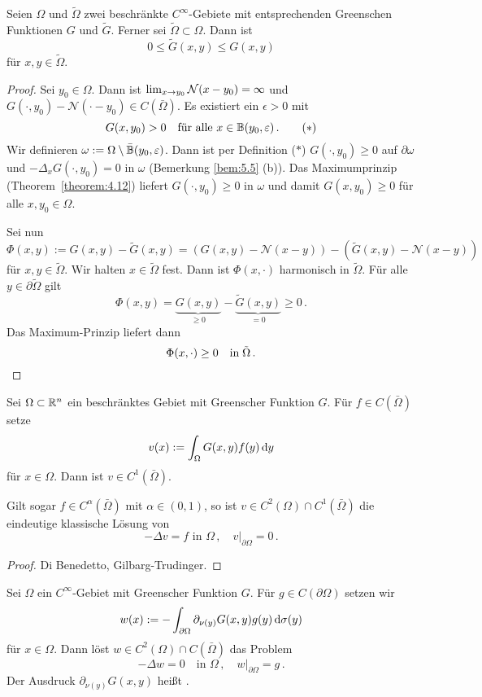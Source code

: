 \begin{lemma}
  \label{lemma:5.6}
  Seien $\Omega$ und $\tilde\Omega$ zwei beschränkte $C^\infty$-Gebiete mit entsprechenden Greenschen Funktionen $G$ und $\tilde G$. Ferner sei $\tilde\Omega\subset\Omega$. Dann ist
  \[ 0\leq \tilde G(x,y)\leq G(x,y) \]
  für $x,y\in\tilde\Omega$.
\end{lemma}

\begin{proof}
  Sei $y_0\in\Omega$. Dann ist $\lim_{x\rightarrow y_0}\mathcal{N}(x-y_0)=\infty$ und $G(\cdot,y_0)-\mathcal{N}(\cdot-y_0)\in C(\bar\Omega)$. Es existiert ein $\epsilon>0$ mit 
  \[ G(x,y_0)>0\quad\text{für alle }x\in\mathbb{B}(y_0,\varepsilon)\, . \tag{$\ast$} \]
  Wir definieren $\omega:=\Omega\setminus\bar{\mathbb{B}}(y_0,\varepsilon)$. Dann ist per Definition ($\ast$) $G(\cdot,y_0)\geq0$ auf $\partial\omega$ und $-\Delta_xG(\cdot,y_0)=0$ in $\omega$ (Bemerkung \ref{bem:5.5} (b)). Das Maximumprinzip (Theorem~\ref{theorem:4.12}) liefert $G(\cdot,y_0)\geq0$ in $\omega$ und damit $G(x,y_0)\geq0$ für alle $x,y_0\in\Omega$.
  
  Sei nun 
  \[ \Phi(x,y):=G(x,y)-\tilde G(x,y)=(G(x,y)-\mathcal{N}(x-y))-(\tilde G(x,y)-\mathcal{N}(x-y)) \]
  für $x,y\in\tilde\Omega$. Wir halten $x\in\tilde\Omega$ fest. Dann ist $\Phi(x, \cdot)$ harmonisch in $\tilde\Omega$. Für alle $y\in\partial\tilde\Omega$ gilt 
  \[
\Phi(x,y)=\underbrace{G(x,y)}_{\geq0}-\underbrace{\tilde G(x,y)}_{=0}\geq0 \, .
\]
Das Maximum-Prinzip liefert dann
\[
\Phi(x,\cdot)\geq0\quad\text{in}\;\tilde\Omega \, .\qedhere
\]
\end{proof}

\begin{theorem}
  \label{theorem:5.7}
  Sei $\Omega\subset\mathbb{R}^n$ ein beschränktes Gebiet mit Greenscher Funktion $G$. Für $f\in C(\bar\Omega)$ setze 
  \[ v(x):=\int_\Omega G(x,y)f(y)\,\mathrm{d} y \]
  für $x\in\Omega$. Dann ist $v\in C^1(\bar\Omega)$. 

  Gilt sogar $f\in C^\alpha(\bar\Omega)$ mit $\alpha\in (0,1)$, so ist $v\in C^2(\Omega)\cap C^1(\bar\Omega)$ die eindeutige klassische Lösung von
  \[
  -\Delta v=f\text{ in }\Omega\, ,\quad v\rvert_{\partial\Omega}=0\, .
  \]
\end{theorem}

\begin{proof}
  Di Benedetto, Gilbarg-Trudinger.
\end{proof}

\begin{theorem}
  \label{theorem:5.8}
  Sei $\Omega$ ein $C^\infty$-Gebiet mit Greenscher Funktion $G$. Für $g\in C(\partial\Omega)$ setzen wir
  \[
  w(x):=-\int_{\partial\Omega}\partial_{\nu(y)}G(x,y)g(y)\,\mathrm{d}\sigma(y)
  \]
  für $x\in\Omega$. Dann löst $w\in C^2(\Omega)\cap C(\bar\Omega)$ das Problem
  \[
    -\Delta w=0\quad\text{in }\Omega \, , \quad w\rvert_{\partial\Omega}=g \, .
  \]
  Der Ausdruck $\partial_{\nu(y)}G(x,y)$ heißt .
\end{theorem}

